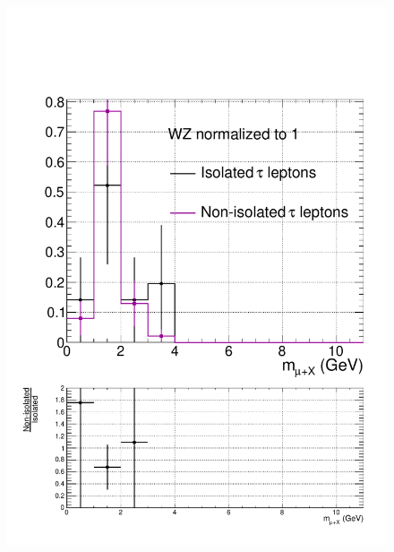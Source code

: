 \begin{figure}[hbtp]
\begin{center}
    \includegraphics[width=0.6\cmsFigWidth]{figures/isoVsNonIsoTaus_WZ_lowMT_v87}

\end{center}
\end{figure}
